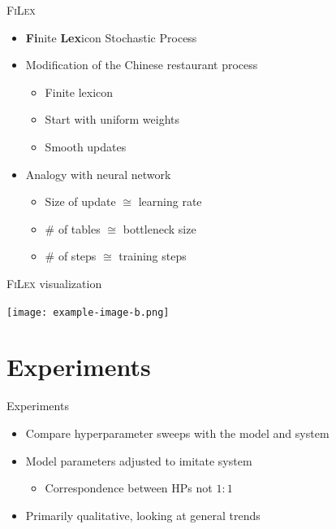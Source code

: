 \documentclass{beamer}
\newif\ifusevizzes
\begin{document}
\begin{frame}{\textsc{FiLex}}
    \begin{itemize}
        \item \textbf{Fi}nite \textbf{Lex}icon Stochastic Process
        \item Modification of the Chinese restaurant process
            \begin{itemize}
                \item Finite lexicon
                \item Start with uniform weights
                \item Smooth updates
            \end{itemize}
        \item Analogy with neural network
            \begin{itemize}
                \item Size of update $\cong$ learning rate
                \item \# of tables $\cong$ bottleneck size
                \item \# of steps $\cong$ training steps
            \end{itemize}
    \end{itemize}
\end{frame}

\begin{frame}{\textsc{FiLex} visualization}
    \begin{center}
    \ifusevizzes
          
      \else
          \texttt{[image: example-image-b.png]}
      \fi
    \end{center}
\end{frame}

\section{Experiments}

\begin{frame}{Experiments}
    \begin{itemize}
        \item Compare hyperparameter sweeps with the model and system
        \item Model parameters adjusted to imitate system
            \begin{itemize}
                \item Correspondence between HPs not $1:1$
            \end{itemize}
        \item Primarily qualitative, looking at general trends
    \end{itemize}
\end{frame}
\end{document}
